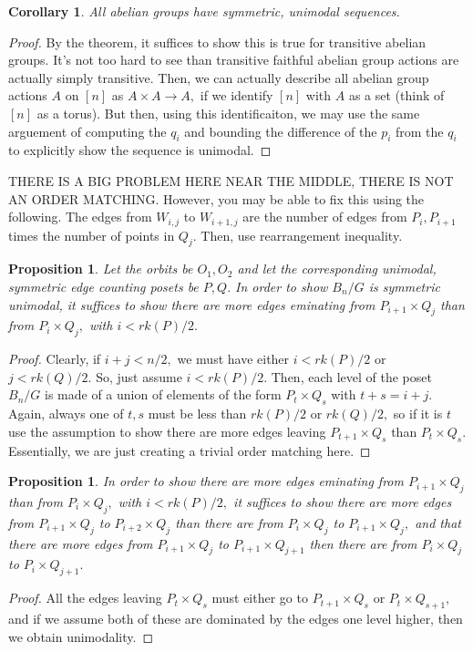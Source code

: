 \documentclass{amsart}
\newtheorem{cor}[subsubsection]{Corollary}
\newtheorem{prop}[subsubsection]{Proposition}
\begin{document}
\begin{cor}
All abelian groups have symmetric, unimodal sequences.
\end{cor}
\begin{proof}
By the theorem, it suffices to show this is true for transitive abelian groups. It's not too hard to see than transitive faithful abelian group actions are actually simply transitive. Then, we can actually describe all abelian group actions $A$ on $[n]$ as $A \times A \rightarrow A,$ if we identify $[n]$ with $A$ as a set (think of $[n]$ as a torus). But then, using this identificaiton, we may use the same arguement of computing the $q_i$ and bounding the difference of the $p_i$ from the $q_i$ to explicitly show the sequence is unimodal.
\end{proof}

THERE IS A BIG PROBLEM HERE NEAR THE MIDDLE, THERE IS NOT AN ORDER MATCHING.
However, you may be able to fix this using the following. The edges from $W_{i,j} $ to $W_{i+1,j}$ are the number of edges from $P_i,P_{i+1}$ times the number of points in $Q_j.$ Then, use rearrangement inequality.

\begin{prop}
Let the orbits be $O_1,O_2$ and let the corresponding unimodal, symmetric edge counting posets be $P,Q.$ In order to show $B_n/G$ is symmetric unimodal, it suffices to show there are more edges eminating from $P_{i+1} \times Q_j$ than from $P_i \times Q_j,$ with $i < rk(P)/2.$
\end{prop}
\begin{proof}
Clearly, if $i+j < n/2,$ we must have either $i < rk(P)/2$ or $j<rk(Q)/2.$ So, just assume $i < rk(P)/2.$ Then, each level of the poset $B_n/G$ is made of a union of elements of the form $P_t \times Q_s$ with $t + s = i+j.$ Again, always one of $t,s$ must be less than $rk(P)/2$ or $rk(Q)/2,$ so if it is $t$ use the assumption to show there are more edges leaving $P_{t+1} \times Q_s$ than $P_t \times Q_s.$ Essentially, we are just creating a trivial order matching here.
\end{proof}

\begin{prop}
In order to show  there are more edges eminating from $P_{i+1} \times Q_j$ than from $P_i \times Q_j,$ with $i < rk(P)/2,$ it suffices to show there are more edges from $P_{i+1} \times Q_j$ to $P_{i+2} \times Q_j$ than there are from $P_i \times Q_j$ to $P_{i+1} \times Q_j,$ and that there are more edges from $P_{i+1} \times Q_j$ to $P_{i+1} \times Q_{j+1}$ then there are from $P_i \times Q_j$ to $P_i \times Q_{j+1}.$
\end{prop}
\begin{proof}
All the edges leaving $P_t \times Q_s$ must either go to $P_{t+1} \times Q_s$ or $P_t \times Q_{s+1},$ and if we assume both of these are dominated by the edges one level higher, then we obtain unimodality.
\end{proof}
\end{document}
